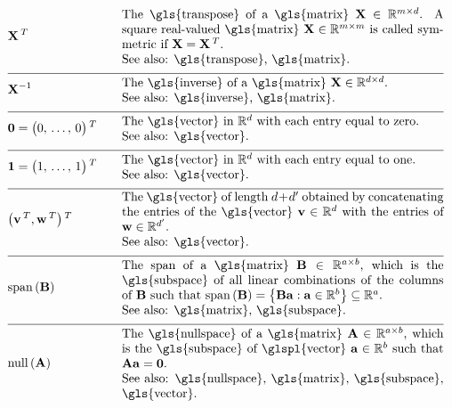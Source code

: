 \newpage
\begin{align} 
	&\mathbf{X}\,^{T} &\quad & \parbox{.75\textwidth}{The \gls{transpose} of a \gls{matrix} $\mathbf{X} \in \mathbb{R}^{\samplesize \times \featurelen}$. 
		A square real-valued \gls{matrix} $\mathbf{X} \in \mathbb{R}^{\samplesize \times \samplesize}$ 
		is called symmetric if $\mathbf{X} = \mathbf{X}\,^{T}$. 
		\\ See also: \gls{transpose}, \gls{matrix}. }  \nonumber \\[2mm] \hline \nonumber\\[-5mm]
	&\mathbf{X}^{-1} &\quad & \parbox{.75\textwidth}{The \gls{inverse} of a \gls{matrix} $\mathbf{X} \in \mathbb{R}^{\featurelen \times \featurelen}$.
		\\ See also: \gls{inverse}, \gls{matrix}. }  \nonumber \\[2mm] \hline \nonumber\\[-5mm]
	&\mathbf{0}= \big(0, \,\ldots, \,0\big)\,^{T}  & \quad &  \parbox{.75\textwidth}{The \gls{vector} in $\mathbb{R}^{\dimlocalmodel}$ with each entry equal to zero.
		\\ See also: \gls{vector}. } \nonumber \\[2mm] \hline \nonumber\\[-5mm]
	&\mathbf{1}= \big(1, \,\ldots, \,1\big)\,^{T}  & \quad &  \parbox{.75\textwidth}{The \gls{vector} in $\mathbb{R}^{\dimlocalmodel}$ with each entry equal to one.
		\\ See also: \gls{vector}. } \nonumber \\[2mm] \hline \nonumber\\[-5mm]
	&\big(\vv\,^{T},\vw\,^{T} \big)\,^{T}  & \quad &  \parbox{.75\textwidth}{The \gls{vector} of length $\featurelen+\featurelen'$ 
		obtained by concatenating the entries of the \gls{vector} $\vv \in \mathbb{R}^{\featurelen}$ with the entries of $\vw \in \mathbb{R}^{\featurelen'}$.
		\\ See also: \gls{vector}. } \nonumber \nonumber \\[2mm] \hline \nonumber\\[-5mm]
	&\linspan{\mathbf{B}}  & \quad &  \parbox{.75\textwidth}{The span of a \gls{matrix} $\mathbf{B} \in \mathbb{R}^{a \times b}$, 
		which is the \gls{subspace} of all linear combinations of the columns of $\mathbf{B}$ such that
		$\linspan{\mathbf{B}} = \big\{  \mathbf{B} \va : \va \in \mathbb{R}^{b} \big\} \subseteq \mathbb{R}^{a}$. 
		\\ See also: \gls{matrix}, \gls{subspace}. }\nonumber \\[2mm] \hline \nonumber\\[-5mm]
	&\nullspace{\mA}& \quad &  \parbox{.75\textwidth}{The \gls{nullspace} of a \gls{matrix} $\mathbf{A} \in \mathbb{R}^{a \times b}$, 
		which is the \gls{subspace} of \glspl{vector} $\va \in \mathbb{R}^{b}$ such that $\mA \va=\mathbf{0}$. 
		\\ See also: \gls{nullspace}, \gls{matrix}, \gls{subspace}, \gls{vector}. }\nonumber 
\end{align} 

